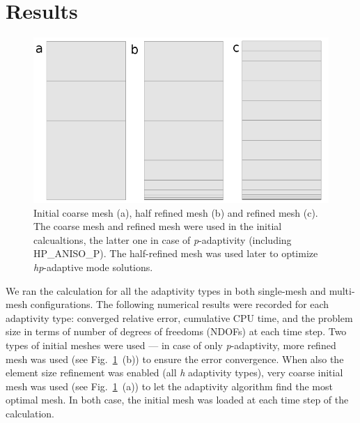 \section{Results}

\begin{figure}
  \begin{centering}
  \includegraphics[width=.8\columnwidth]{mesh}
  \caption{\label{fig:mesh} Initial coarse mesh (a),
  	half refined mesh (b) and refined mesh (c). The coarse mesh
	and refined mesh were used in the initial calcualtions, the latter one
	in case of \emph{p}-adaptivity (including HP\_ANISO\_P). The half-refined mesh was
	used later to optimize \emph{hp}-adaptive mode solutions.}
  \end{centering}
\end{figure}
We ran the calculation for all the adaptivity types 
in both single-mesh and multi-mesh configurations. 
The following numerical results were recorded for each 
adaptivity type: converged relative error, cumulative CPU
time, and the problem size in terms of number
of degrees of freedoms (NDOFs) at each time step.  
Two types of initial meshes were used --- in case of only \emph{p}-adaptivity,
more refined mesh was used (see Fig.~\ref{fig:mesh}~(b)) to ensure
the error convergence.
When also the element size refinement
was enabled (all \emph{h} adaptivity types), very coarse initial mesh
was used (see Fig.~\ref{fig:mesh}~(a)) to let the adaptivity
algorithm find the most optimal mesh. 
In both case, the initial mesh was loaded at each time step of the
calculation.

